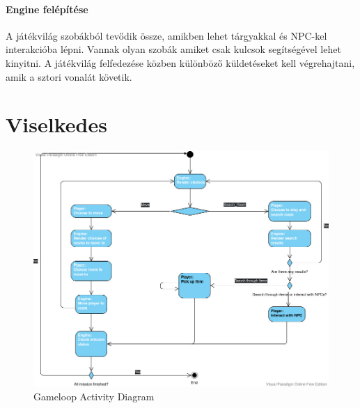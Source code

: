\documentclass{scrarticle}
\begin{document}
\paragraph{Engine felépítése}
A játékvilág szobákból tevődik össze, amikben lehet tárgyakkal és NPC-kel interakcióba lépni. Vannak olyan szobák amiket csak kulcsok segítségével lehet kinyitni. A játékvilág felfedezése közben különböző küldetéseket kell végrehajtani, amik a sztori vonalát követik.

\section{Viselkedes}
\begin{figure}[H]
    \includegraphics[width=1.0\columnwidth]{GameLoop_ActivityDiagram.jpg}
    \caption{Gameloop Activity Diagram}\label{fig:4}
\end{figure}
\end{document}
